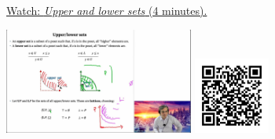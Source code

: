 
\begin{minipage}{10cm}
    \href{https://act4e-spring21.netlify.app/videos/spring2021-design:up-low-sets.html}{Watch: \emph{Upper and lower sets} (4 minutes).}
        
    \href{https://act4e-spring21.netlify.app/videos/spring2021-design:up-low-sets.html}{\includegraphics[height=3.5cm]{spring2021-design:up-low-sets/thumbnails.jpg}}
    \href{https://act4e-spring21.netlify.app/videos/spring2021-design:up-low-sets.html}{\includegraphics[height=2.5cm]{spring2021-design:up-low-sets/qrcode.png}}
\end{minipage}
